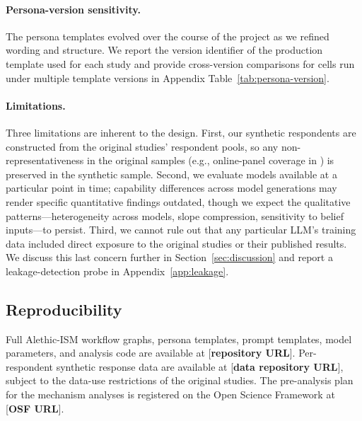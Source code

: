 \documentclass[12pt]{article}
\begin{document}
\paragraph{Persona-version sensitivity.} The persona templates evolved over the course of the project as we refined wording and structure. We report the version identifier of the production template used for each study and provide cross-version comparisons for cells run under multiple template versions in Appendix Table~\ref{tab:persona-version}.

\paragraph{Limitations.} Three limitations are inherent to the design. First, our synthetic respondents are constructed from the original studies' respondent pools, so any non-representativeness in the original samples (e.g., online-panel coverage in \textcite{Giguere2020}) is preserved in the synthetic sample. Second, we evaluate models available at a particular point in time; capability differences across model generations may render specific quantitative findings outdated, though we expect the qualitative patterns---heterogeneity across models, slope compression, sensitivity to belief inputs---to persist. Third, we cannot rule out that any particular LLM's training data included direct exposure to the original studies or their published results. We discuss this last concern further in Section~\ref{sec:discussion} and report a leakage-detection probe in Appendix~\ref{app:leakage}.

\subsection{Reproducibility}\label{sec:methods-reproducibility}

Full Alethic-ISM workflow graphs, persona templates, prompt templates, model parameters, and analysis code are available at [\textbf{repository URL}]. Per-respondent synthetic response data are available at [\textbf{data repository URL}], subject to the data-use restrictions of the original studies. The pre-analysis plan for the mechanism analyses is registered on the Open Science Framework at [\textbf{OSF URL}].

%
%
\end{document}

